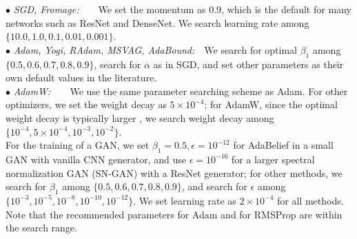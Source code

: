 \documentclass{article}
\begin{document}
$\bullet$ \textit{SGD, Fromage:}\ \ \ \ We set the momentum as $0.9$, which is the default for many networks such as ResNet \cite{he2016deep} and DenseNet\cite{huang2017densely}. We search learning rate among $\{10.0, 1.0, 0.1, 0.01, 0.001\}$. \\
$\bullet$ \textit{Adam, Yogi, RAdam, MSVAG, AdaBound:}\ \ We search for optimal $\beta_1$ among $\{0.5, 0.6, 0.7, 0.8, 0.9\}$, search for $\alpha$ as in SGD, and set other parameters as their own default values in the literature.\\
$\bullet$ \textit{AdamW:}\ \ \ \ We use the same parameter searching scheme as Adam. For other optimizers, we set the weight decay as $5\times10^{-4}$; for AdamW, since the optimal weight decay is typically larger \cite{loshchilov2017decoupled}, we search weight decay among $\{10^{-4},5 \times 10^{-4},10^{-3},10^{-2}\}$. \\
For the training of a GAN, we set $\beta_1=0.5, \epsilon=10^{-12}$ for AdaBelief in a small GAN with vanilla CNN generator, and use $\epsilon=10^{-16}$ for a larger spectral normalization GAN (SN-GAN) with a ResNet generator; for other methods, we search for $\beta_1$ among $\{0.5, 0.6, 0.7, 0.8,0.9\}$, and search for 
$\epsilon$ among $\{10^{-3},10^{-5},10^{-8},10^{-10},10^{-12}\}$.
We set learning rate as $2\times10^{-4}$ for all methods. Note that the recommended parameters for Adam \cite{radford2015unsupervised} and for RMSProp \cite{salimans2016improved} are within the search range.

\end{document}

